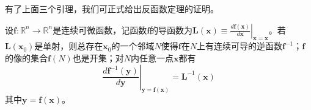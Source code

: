 \documentclass[main.tex]{subfiles}
\begin{document}
有了上面三个引理，我们可正式给出反函数定理的证明。
\begin{theorem}[反函数定理]
设$\mathbf{f}:\mathbb{R}^n\rightarrow\mathbb{R}^n$是连续可微函数，记函数$\mathbf{f}$的导函数为$\mathbf{L}\left(\mathbf{x}\right)\equiv\left.\frac{d\mathbf{f}\left(\mathbf{x}\right)}{d\mathbf{x}}\right|_{\mathbf{x}=\mathbf{x}}$。若$\mathbf{L}\left(\mathbf{x}_0\right)$是单射，则总存在$\mathbf{x}_0$的一个邻域$N$使得$\mathbf{f}$在$N$上有连续可导的逆函数$\mathbf{f}^{-1}$；$\mathbf{f}$的像的集合$\mathbf{f}\left(N\right)$也是开集；对$N$内任意一点$\mathbf{x}$都有
\[
\left.\frac{d\mathbf{f}^{-1}\left(\mathbf{y}\right)}{d\mathbf{y}}\right|_{\mathbf{y}=\mathbf{f}\left(\mathbf{x}\right)}=\mathbf{L}^{-1}\left(\mathbf{x}\right)
\]
其中$\mathbf{y}=\mathbf{f}\left(\mathbf{x}\right)$。
\end{theorem}
\end{document}
